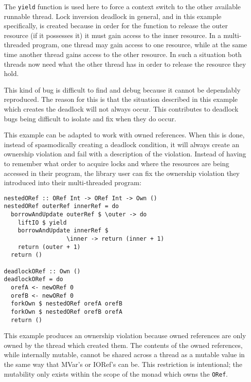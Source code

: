 \documentclass[onehalf,11pt]{beavtex}
\begin{document}
The \texttt{yield} function is used here to force a context switch to the other
available runnable thread.
Lock inversion deadlock in general, and in this example
specifically, is created because in order for the function to release the outer
resource (if it possesses it) it must gain access to the inner resource.
In a multi-threaded program, one thread may gain access to one resource,
while at the same time another thread gains access to the other resource.
In such a situation both threads now need what the other thread has in order to
release the resource they hold.

This kind of bug is difficult to find and debug because it cannot be dependably
reproduced.  The reason for this is that the situation described in this
example which creates the deadlock will not always occur.
This contributes to deadlock bugs being difficult to isolate and fix when they
do occur.

This example can be adapted to work with owned references.
When this is done, instead of spasmodically creating a deadlock condition,
it will always create an ownership violation and fail with a description of the
violation.
Instead of having to remember what order to acquire locks and where the
resources are being accessed in their program, the library user can fix the
ownership violation they introduced into their multi-threaded program:

\begin{lstlisting}
nestedORef :: ORef Int -> ORef Int -> Own ()
nestedORef outerRef innerRef = do
  borrowAndUpdate outerRef $ \outer -> do
    liftIO $ yield
    borrowAndUpdate innerRef $ 
                  \inner -> return (inner + 1)
    return (outer + 1)
  return ()

deadlockORef :: Own ()
deadlockORef = do
  orefA <- newORef 0
  orefB <- newORef 0
  forkOwn $ nestedORef orefA orefB
  forkOwn $ nestedORef orefB orefA
  return ()
\end{lstlisting}

This example %
produces an ownership violation because owned references are only owned by the
thread which created them.
The contents of the owned references, while internally mutable, cannot be shared
across a thread as a mutable value in the same way that MVar's or IORef's can be.
This restriction is intentional; the mutability only exists within the scope of
the monad which owns the \texttt{ORef}.
\end{document}
